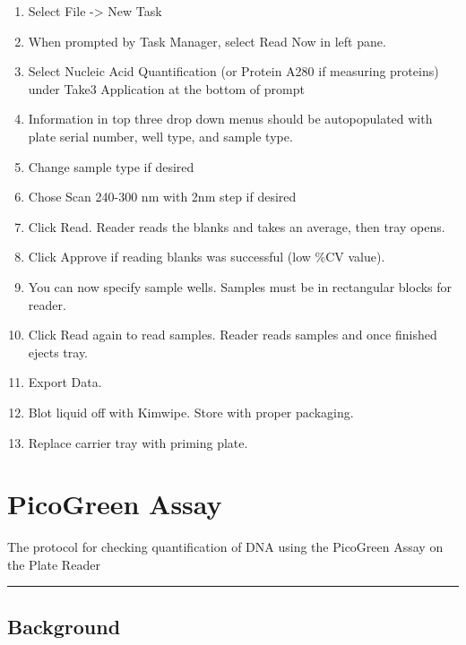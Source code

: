 \documentclass[
  letterpaper,
  DIV=11,
  numbers=noendperiod]{scrreprt}
\begin{document}
\begin{enumerate}
\def\labelenumi{\arabic{enumi}.}
\item
  Select File -\textgreater{} New Task
\item
  When prompted by Task Manager, select Read Now in left pane.
\item
  Select Nucleic Acid Quantification (or Protein A280 if measuring
  proteins) under Take3 Application at the bottom of prompt
\item
  Information in top three drop down menus should be autopopulated with
  plate serial number, well type, and sample type.
\item
  Change sample type if desired
\item
  Chose Scan 240-300 nm with 2nm step if desired
\item
  Click Read. Reader reads the blanks and takes an average, then tray
  opens.
\item
  Click Approve if reading blanks was successful (low \%CV value).
\item
  You can now specify sample wells. Samples must be in rectangular
  blocks for reader.
\item
  Click Read again to read samples. Reader reads samples and once
  finished ejects tray.
\item
  Export Data.
\item
  Blot liquid off with Kimwipe. Store with proper packaging.
\item
  Replace carrier tray with priming plate.\\
\end{enumerate}

\hypertarget{picogreen-assay}{%
\chapter{PicoGreen Assay}\label{picogreen-assay}}

The protocol for checking quantification of DNA using the PicoGreen
Assay on the Plate Reader

\begin{center}\rule{0.5\linewidth}{0.5pt}\end{center}

\hypertarget{background-1}{%
\section*{\texorpdfstring{\textbf{Background}}{Background}}\label{background-1}}
\end{document}
